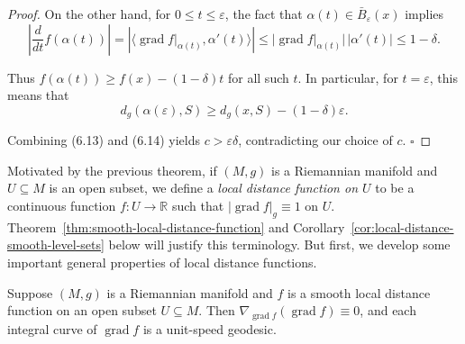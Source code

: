 \begin{proof}
On the other hand, for $0 \le t \le \varepsilon$, the fact that $\alpha(t) \in \bar{B}_\varepsilon(x)$ implies
\[
\left| \frac{d}{dt} f(\alpha(t)) \right| = \left| \langle \operatorname{grad} f|_{\alpha(t)}, \alpha'(t) \rangle \right| \le |\operatorname{grad} f|_{\alpha(t)}| \, |\alpha'(t)| \le 1 - \delta.
\]

Thus $f(\alpha(t)) \ge f(x) - (1-\delta)t$ for all such $t$. In particular, for $t = \varepsilon$, this means that
\begin{equation}
d_g(\alpha(\varepsilon), S) \ge d_g(x, S) - (1-\delta)\varepsilon. \tag{6.14}
\end{equation}

Combining (6.13) and (6.14) yields $c > \varepsilon\delta$, contradicting our choice of $c$. $\square$
\end{proof}

Motivated by the previous theorem, if $(M, g)$ is a Riemannian manifold and $U \subseteq M$ is an open subset, we define a \emph{local distance function on $U$} to be a continuous function $f : U \to \mathbb{R}$ such that $|\operatorname{grad} f|_g \equiv 1$ on $U$. Theorem~\ref{thm:smooth-local-distance-function} and Corollary~\ref{cor:local-distance-smooth-level-sets} below will justify this terminology. But first, we develop some important general properties of local distance functions.

\begin{theorem}
\label{thm:local-distance-geodesic-integral-curve}

Suppose $(M, g)$ is a Riemannian manifold and $f$ is a smooth local distance function on an open subset $U \subseteq M$. Then $\nabla_{\operatorname{grad} f} (\operatorname{grad} f) \equiv 0$, and each integral curve of $\operatorname{grad} f$ is a unit-speed geodesic.
\end{theorem}

